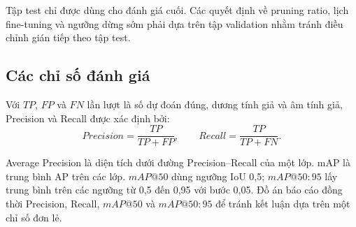 Tập test chỉ được dùng cho đánh giá cuối. Các quyết định về pruning ratio, lịch
fine-tuning và ngưỡng dừng sớm phải dựa trên tập validation nhằm tránh điều chỉnh
gián tiếp theo tập test.

\subsection{Các chỉ số đánh giá}

Với $TP$, $FP$ và $FN$ lần lượt là số dự đoán đúng, dương tính giả và âm tính
giả, Precision và Recall được xác định bởi:
\begin{equation}
  Precision=\frac{TP}{TP+FP}, \qquad
  Recall=\frac{TP}{TP+FN}.
\end{equation}

Average Precision là diện tích dưới đường Precision--Recall của một lớp. mAP
là trung bình AP trên các lớp. $mAP@50$ dùng ngưỡng IoU 0,5; $mAP@50{:}95$
lấy trung bình trên các ngưỡng từ 0,5 đến 0,95 với bước 0,05. Đồ án báo cáo đồng
thời Precision, Recall, $mAP@50$ và $mAP@50{:}95$ để tránh kết luận dựa trên
một chỉ số đơn lẻ.